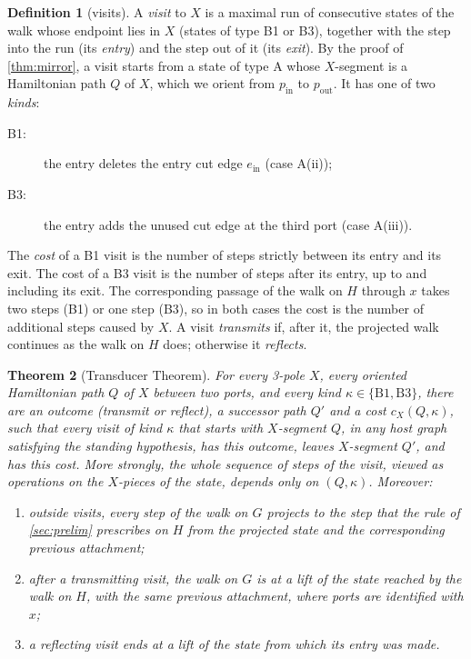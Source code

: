 \documentclass[11pt]{article}
\newtheorem{theorem}{Theorem}
\theoremstyle{definition}
\newtheorem{definition}[theorem]{Definition}
\newcommand{\inn}{\mathrm{in}}
\begin{document}
\begin{definition}[visits]
A \emph{visit} to $X$ is a maximal run of consecutive states of the walk whose endpoint lies in
$X$ (states of type B1 or B3), together with the step into the run (its \emph{entry}) and the step
out of it (its \emph{exit}). By the proof of \cref{thm:mirror}, a visit starts from a state of type A whose
$X$-segment is a Hamiltonian path $Q$ of $X$, which we orient from $p_\inn$ to $p_{\mathrm{out}}$.
It has one of two \emph{kinds}:
\begin{description}
\item[B1:] the entry deletes the entry cut edge $e_\inn$ (case A(ii));
\item[B3:] the entry adds the unused cut edge at the third port (case A(iii)).
\end{description}
The \emph{cost} of a B1 visit is the number of steps strictly between its entry and its exit. The
cost of a B3 visit is the number of steps after its entry, up to and including its exit. The
corresponding passage of the walk on $H$ through $x$ takes two steps (B1) or one step (B3), so in
both cases the cost is the number of additional steps caused by $X$. A visit \emph{transmits} if,
after it, the projected walk continues as the walk on $H$ does; otherwise it \emph{reflects}.
\end{definition}

\begin{theorem}[Transducer Theorem]\label{thm:transducer}
For every 3-pole $X$, every oriented Hamiltonian path $Q$ of $X$ between two ports, and every kind
$\kappa \in \{\mathrm{B1}, \mathrm{B3}\}$, there are an outcome (transmit or reflect), a successor
path $Q'$ and a cost $c_X(Q,\kappa)$, such that every visit of kind $\kappa$ that starts with
$X$-segment $Q$, in any host graph satisfying the standing hypothesis, has this outcome, leaves
$X$-segment $Q'$, and has this cost. More strongly, the whole sequence of steps of the visit,
viewed as operations on the $X$-pieces of the state, depends only on $(Q, \kappa)$. Moreover:
\begin{enumerate}
\item outside visits, every step of the walk on $G$ projects to the step that the rule of
\cref{sec:prelim} prescribes on $H$ from the projected state and the corresponding previous
attachment;
\item after a transmitting visit, the walk on $G$ is at a lift of the state reached by the walk on
$H$, with the same previous attachment, where ports are identified with $x$;
\item a reflecting visit ends at a lift of the state from which its entry was made.
\end{enumerate}
\end{theorem}
\end{document}
